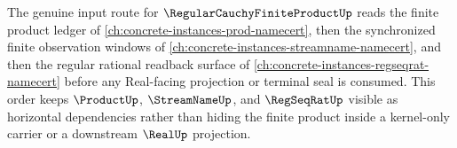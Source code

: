 The genuine input route for $\RegularCauchyFiniteProductUp$ reads the finite product ledger of \autoref{ch:concrete-instances-prod-namecert}, then the synchronized finite observation windows of \autoref{ch:concrete-instances-streamname-namecert}, and then the regular rational readback surface of \autoref{ch:concrete-instances-regseqrat-namecert} before any Real-facing projection or terminal seal is consumed. This order keeps $\ProductUp$, $\StreamNameUp$, and $\RegSeqRatUp$ visible as horizontal dependencies rather than hiding the finite product inside a kernel-only carrier or a downstream $\RealUp$ projection.
